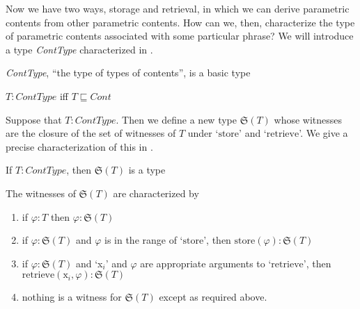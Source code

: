 Now we have two ways, storage and retrieval, in which we can derive parametric contents from
other parametric contents.  How can we, then, characterize the type of
parametric contents associated with some particular phrase?  We will introduce a type \textit{ContType}
characterized in \nexteg{}.
\begin{ex} 
\begin{subex} 
 
\item \textit{ContType}, ``the type of types of contents'', is a basic type 
 
\item $T:\textit{ContType}$ iff $T\sqsubseteq\textit{Cont}$ 
 
\end{subex} 
   
\end{ex}
Suppose
that $T:\textit{ContType}$.  Then we define a new type
$\mathfrak{S}(T)$ whose witnesses are the closure of the set of
witnesses of $T$ under `$\mathrm{store}$' and `$\mathrm{retrieve}$'.
We give a precise characterization of this in \nexteg{}.
\begin{ex} 
\begin{subex} 
 
\item If $T:\textit{ContType}$, then $\mathfrak{S}(T)$ is a type 
 
\item The witnesses of $\mathfrak{S}(T)$ are characterized by
  \begin{enumerate} 
 
  \item if $\varphi:T$ then $\varphi:\mathfrak{S}(T)$ 
 
  \item if $\varphi:\mathfrak{S}(T)$ and $\varphi$ is in the range of `$\mathrm{store}$', then
    $\mathrm{store}(\varphi):\mathfrak{S}(T)$

  \item if $\varphi:\mathfrak{S}(T)$ and `x$_i$' and $\varphi$ are appropriate
    arguments to `$\mathrm{retrieve}$', then
    $\mathrm{retrieve}(\text{x}_i,\varphi):\mathfrak{S}(T)$
    
  \item nothing is a witness for $\mathfrak{S}(T)$ except as required above.
 
  \end{enumerate} 
  
 
\end{subex} 
\label{ex:storage-type}   
\end{ex}

